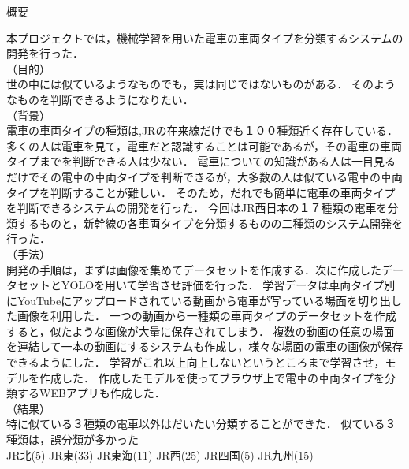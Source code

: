 

\begin{center}
		{\gtfamily \Large 概要}
\end{center}
\vspace{1cm}
\thispagestyle{empty}	



本プロジェクトでは，機械学習を用いた電車の車両タイプを分類するシステムの開発を行った．\\
（目的）\\
世の中には似ているようなものでも，実は同じではないものがある．
そのようなものを判断できるようになりたい．\\
（背景）\\
電車の車両タイプの種類は,JRの在来線だけでも１００種類近く存在している．
多くの人は電車を見て，電車だと認識することは可能であるが，その電車の車両タイプまでを判断できる人は少ない．
電車についての知識がある人は一目見るだけでその電車の車両タイプを判断できるが，大多数の人は似ている電車の車両タイプを判断することが難しい．
そのため，だれでも簡単に電車の車両タイプを判断できるシステムの開発を行った．
今回はJR西日本の１７種類の電車を分類するものと，新幹線の各車両タイプを分類するものの二種類のシステム開発を行った．\\
（手法）\\
開発の手順は，まずは画像を集めてデータセットを作成する．次に作成したデータセットとYOLOを用いて学習させ評価を行った．
学習データは車両タイプ別にYouTubeにアップロードされている動画から電車が写っている場面を切り出した画像を利用した．
一つの動画から一種類の車両タイプのデータセットを作成すると，似たような画像が大量に保存されてしまう．
複数の動画の任意の場面を連結して一本の動画にするシステムも作成し，様々な場面の電車の画像が保存できるようにした．
学習がこれ以上向上しないというところまで学習させ，モデルを作成した．
作成したモデルを使ってブラウザ上で電車の車両タイプを分類するWEBアプリも作成した．\\
（結果）\\
特に似ている３種類の電車以外はだいたい分類することができた．
似ている３種類は，誤分類が多かった
\\
JR北(5)
JR東(33)
JR東海(11)
JR西(25)
JR四国(5)
JR九州(15)
\clearpage
